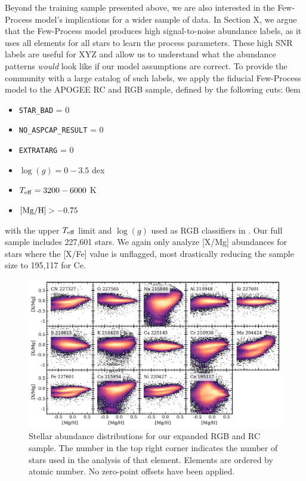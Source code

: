 \documentclass[modern]{aastex631}
\newcommand{\mgh}{[{\rm Mg}/{\rm H}]}
\newcommand{\logg}{\log(g)}
\newcommand{\teff}{T_{\rm eff}}
\begin{document}
Beyond the training sample presented above, we are also interested in the Few-Process model's implications for a wider sample of data. In Section X, we argue that the Few-Process model produces high signal-to-noise abundance labels, as it uses all elements for all stars to learn the process parameters. These high SNR labels are useful for XYZ and allow us to understand what the abundance patterns \textit{would} look like if our model assumptions are correct. To provide the community with a large catalog of such labels, we apply the fiducial Few-Process model to the APOGEE RC and RGB sample, defined by the following cuts:
\itemsep0em
\begin{itemize}
    \item \texttt{STAR\_BAD} = 0
    \item \texttt{NO\_ASPCAP\_RESULT} = 0
    \item \texttt{EXTRATARG} = 0
    \item $\logg =  0 - 3.5$ dex
    \item $\teff = 3200-6000$ K
    \item $\mgh > -0.75$
\end{itemize}
with the upper $\teff$ limit and $\logg$ used as RGB classifiers in \citet{jonsson2020}. Our full sample includes 227,601 stars. We again only analyze [X/Mg] abundances for stars where the [X/Fe] value is unflagged, most drastically reducing the sample size to 195,117 for Ce. 

\begin{figure}[htb!]
    \centering
    \includegraphics[width=\textwidth]{Figures/xmg_test.pdf}
    \caption{Stellar abundance distributions for our expanded RGB and RC sample. The number in the top right corner indicates the number of stars used in the analysis of that element. Elements are ordered by atomic number. No zero-point offsets have been applied.}
    \label{fig:exp_xmg}
\end{figure}
\end{document}
